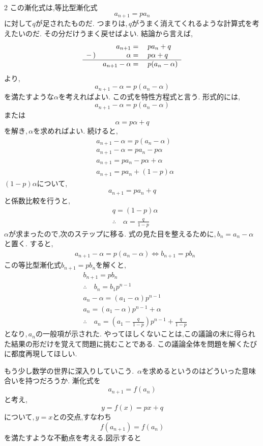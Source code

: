 \documentclass[dvipdfmx,a4paper,11pt,fleqn,openany]{jsbook}
\begin{document}
\begin{multicols*}{2}
    この漸化式は,等比型漸化式
    \[
      a_{n+1}=pa_n
    \]
    に対して$q$が足されたものだ.
    つまりは,\,$q$がうまく消えてくれるような計算式を考えたいのだ.
    その分だけうまく戻せばよい.
    結論から言えば,
    \[
      \begin{array}{rrl}
         & a_{n+1}={} & pa_n+q\\
        -\,) & \alpha={} & p\alpha+q\\ \hline
         & a_{n+1}-\alpha={} & p(a_n-\alpha)
      \end{array}
    \]
    より,
    \[
      a_{n+1}-\alpha=p(a_n-\alpha)
    \]
    を満たすような$\alpha$を考えればよい.
    この式を特性方程式と言う.
    形式的には,
    \[
      a_{n+1}-\alpha=p(a_n-\alpha)
    \]
    または
    \[
      \alpha=p\alpha+q
    \]
    を解き,\,$\alpha$を求めればよい.
    続けると,
    \begin{align*}
      &a_{n+1}-\alpha=p(a_n-\alpha)\\
      &a_{n+1}-\alpha=pa_n-p\alpha\\
      &a_{n+1}=pa_n-p\alpha+\alpha\\
      &a_{n+1}=pa_n+(1-p)\alpha
    \end{align*}
    $(1-p)\alpha$について,
    \[
      a_{n+1}=pa_n+q
    \]
    と係数比較を行うと,
    \begin{align*}
      &q=(1-p)\alpha\\
      &\therefore \quad \alpha=\frac{q}{1-p}
    \end{align*}
    $\alpha$が求まったので,次のステップに移る.
    式の見た目を整えるために,\,$b_n=a_n-\alpha$と置く.
    すると,
    \begin{align*}
      &a_{n+1}-\alpha=p(a_n-\alpha) \iff b_{n+1}=pb_n
    \end{align*}
    この等比型漸化式$b_{n+1}=pb_n$を解くと,
    \begin{align*}
      &b_{n+1}=pb_n\\
      &\therefore \quad b_n=b_1p^{n-1}\\
      &a_n-\alpha=(a_1-\alpha)p^{n-1}\\
      &a_n=(a_1-\alpha)p^{n-1}+\alpha\\
      &\therefore \quad a_n=\left(a_1-\frac{q}{1-p}\right)p^{n-1}+\frac{q}{1-p}
    \end{align*}
    となり,\,$a_n$の一般項が示された.
    やってほしくないことは,この議論の末に得られた結果の形だけを覚えて問題に挑むことである.
    この議論全体を問題を解くたびに都度再現してほしい.

    もう少し数学の世界に深入りしていこう.
    \,$\alpha$を求めるというのはどういった意味合いを持つだろうか.
    漸化式を
    \[
      a_{n+1}=f(a_n)
    \]
    と考え,
    \[
      y=f(x)=px+q
    \]
    について,\,$y=x$との交点,すなわち
    \[
      f(a_{n+1})=f(a_n)
    \]
    を満たすような不動点を考える.図示すると


\end{multicols*}
\end{document}
